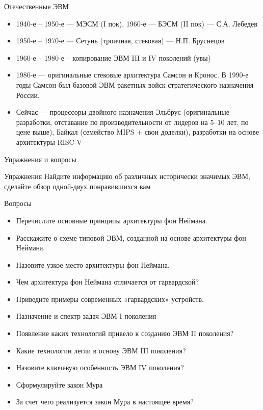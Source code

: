 \documentclass[xetex,aspectratio=43]{beamer}
\begin{document}
\begin{frame}{Отечественные ЭВМ}
	\begin{itemize}
		\item
		1940-е -- 1950-е --- МЭСМ (I пок), 1960-е --- БЭСМ (II пок) --- С.А.
		Лебедев
		\item
		1950-е -- 1970-е --- Сетунь (троичная, стековая) --- Н.П. Бруснецов
		\item
		1960-е -- 1980-е -- копирование ЭВМ III и IV поколений (увы)
		\item
		1980-е --- оригинальные стековые архитектура Самсон и Кронос. В 1990-е
		годы Самсон был базовой ЭВМ ракетных войск стратегического назначения
		России.
		\item
		Сейчас --- процессоры двойного назначения Эльбрус (оригинальные
		разработки, отставание по производительности от лидеров на 5--10 лет,
		по цене выше), Байкал (семейство MIPS + свои доделки), разработки на
		основе архитектуры RISC-V
	\end{itemize}
\end{frame}

\begin{frame}{Упражнения и вопросы}
	\begin{block}{Упражнения}
		Найдите информацию об различных исторически значимых ЭВМ, сделайте обзор
		одной-двух понравившихся вам
	\end{block}

	\begin{block}{Вопросы}
		\begin{itemize}
			\tightlist
			\item
			Перечислите основные принципы архитектуры фон Неймана.
			\item
			Расскажите о схеме типовой ЭВМ, созданной на основе архитектуры фон
			Неймана.
			\item
			Назовите узкое место архитектуры фон Неймана.
			\item
			Чем архитектура фон Неймана отличается от гарвардской?
			\item
			Приведите примеры современных «гарвардских» устройств.
			\item
			Назначение и спектр задач ЭВМ I поколения
			\item
			Появление каких технологий привело к созданию ЭВМ II поколения?
			\item
			Какие технологии легли в основу ЭВМ III поколения?
			\item
			Назовите ключевую особенность ЭВМ IV поколения?
			\item
			Сформулируйте закон Мура
			\item
			За счет чего реализуется закон Мура в настоящее время?
		\end{itemize}
	\end{block}
\end{frame}

\postamble
\end{document}
